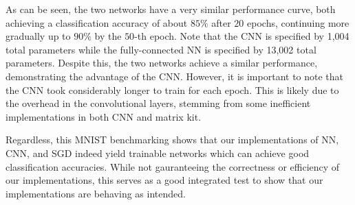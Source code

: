As can be seen, the two networks have a very similar performance curve, both achieving a classification accuracy of about $85\%$ after $20$ epochs, continuing more gradually up to $90\%$ by the $50$-th epoch.
Note that the CNN is specified by 1,004 total parameters while the fully-connected NN is specified by 13,002 total parameters.
Despite this, the two networks achieve a similar performance, demonstrating the advantage of the CNN.
However, it is important to note that the CNN took considerably longer to train for each epoch.
This is likely due to the overhead in the convolutional layers, stemming from some inefficient implementations in both CNN and matrix kit.

Regardless, this MNIST benchmarking shows that our implementations of NN, CNN, and SGD indeed yield trainable networks which can achieve good classification accuracies.
While not gauranteeing the correctness or efficiency of our implementations, this serves as a good integrated test to show that our implementations are behaving as intended.
